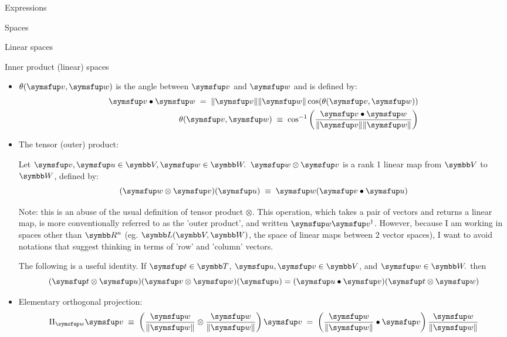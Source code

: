 \documentclass{PalisadesLakesArticle}
\begin{document}
\begin{plSection}{Expressions}
\begin{plSection}{Spaces}
\begin{plSection}{Linear spaces}
\begin{plSection}{Inner product (linear) spaces}
\begin{itemize}
\item $\theta(\Vector{v},\Vector{w})$ is the angle between $\Vector{v}$ and $\Vector{w}$
and is defined by:
\begin{eqnarray}
\Vector{v} \bullet \Vector{w} \; = \; \| \Vector{v} \| \| \Vector{w} \| \cos(\theta(\Vector{v},\Vector{w}))
\\
\theta(\Vector{v},\Vector{w})
\; \equiv \;
\cos^{-1} \left(\frac{ \Vector{v} \bullet \Vector{w} }{\| \Vector{v} \| \| \Vector{w} \| } \right)
\nonumber
\end{eqnarray}

\item The tensor (outer) product:

Let $\Vector{v}, \Vector{u} \in \Space{V}, \Vector{w} \in \Space{W}.$
$\Vector{w} \otimes \Vector{v}$ is a rank 1 linear map
from $\Space{V}$ to $\Space{W}$, defined by:
\begin{equation}
(\Vector{w} \otimes \Vector{v})
(\Vector{u}) \; \equiv \; \Vector{w} 
(\Vector{v} \bullet \Vector{u})
\end{equation}

Note: this is an abuse of the usual definition of tensor product $\otimes$.
This operation, which takes a pair of vectors and returns a linear map,
is more conventionally referred to as the 'outer product',
and written $\Vector{w} \Vector{v}^{\dagger}$.
However, because I am working in spaces other than $\Reals^n$
(eg. $\Space{L}(\Space{V},\Space{W})$, the space of linear maps
between 2 vector spaces),
I want to avoid notations that suggest thinking in terms
of 'row' and 'column' vectors.

The following is a useful identity.
If $\Vector{t} \in \Space{T}$, 
$\Vector{u}, \Vector{v} \in \Space{V}$, 
and $\Vector{w} \in \Space{W}.$
then
\begin{equation}
\label{eq:tensor-dot}
(\Vector{t} \otimes \Vector{u}) 
(\Vector{v} \otimes \Vector{w})(\Vector{u}) 
= (\Vector{u} \bullet \Vector{v}) (\Vector{t} \otimes \Vector{w})
\end{equation}

\item Elementary orthogonal projection:
\begin{equation}
\Projection_{\Vector{w}} \Vector{v}
\; \equiv \;
\left( \frac{ \Vector{w} }{ \| \Vector{w} \| } \otimes 
\frac{ \Vector{w} }{ \| \Vector{w} \| } \right) \Vector{v}
\; = \;
\left(
\frac{\Vector{w} }{\|\Vector{w}\|} \bullet \Vector{v} 
\right) 
\frac{\Vector{w}}{\|\Vector{w}\|}
\end{equation}


\end{itemize}
\end{plSection}
\end{plSection}
\end{plSection}
\end{plSection}
\end{document}
